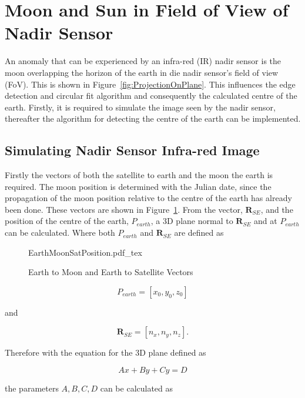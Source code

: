 \section{Moon and Sun in Field of View of Nadir Sensor}
An anomaly that can be experienced by an infra-red (IR) nadir sensor is the moon overlapping the horizon of the earth in die nadir sensor's field of view (FoV). This is shown in Figure~\ref{fig:ProjectionOnPlane}. This influences the edge detection and circular fit algorithm \cite{Wessels2018, Helgard2008} and consequently the calculated centre of the earth. Firstly, it is required to simulate the image seen by the nadir sensor, thereafter the algorithm for detecting the centre of the earth can be implemented.

\subsection{Simulating Nadir Sensor Infra-red Image}
Firstly the vectors of both the satellite to earth and the moon the earth is required. The moon position is determined with the Julian date, since the propagation of the moon position relative to the centre of the earth has already been done. These vectors are shown in Figure~\ref{fig:EarthMoonSatPosition}. From the vector, $\mathbf{R}_{SE}$, and the position of the centre of the earth, $P_{earth}$, a 3D plane normal to $\mathbf{R}_{SE}$ and at $P_{earth}$ can be calculated. Where both $P_{earth}$ and $\mathbf{R}_{SE}$ are defined as

\begin{figure}[!htb]
	\centering
	\def\svgwidth{14cm}
	{EarthMoonSatPosition.pdf_tex}
	\caption{Earth to Moon and Earth to Satellite Vectors}
	\label{fig:EarthMoonSatPosition}
\end{figure}

\begin{equation}
	P_{earth} = [x_0, y_0, z_0]
\end{equation}

and  

\begin{equation}
	\mathbf{R}_{SE} = [n_x, n_y, n_z].
\end{equation}

Therefore with the equation for the 3D plane defined as 

\begin{equation}
Ax + By + Cy = D
\end{equation}

the parameters $A, B, C, D$ can be calculated as

